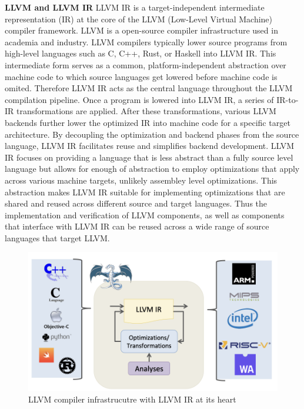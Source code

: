 \textbf{LLVM and LLVM IR}
LLVM IR is a target-independent intermediate representation (IR) at the core of the LLVM (Low-Level Virtual Machine) compiler framework. LLVM is a open-source compiler infrastructure used in academia and industry. LLVM compilers typically lower source programs from high-level languages such as C, C++, Rust, or Haskell into LLVM IR. This intermediate form serves as a common, platform-independent abstraction over machine code to which source languages get lowered before  machine code is omited. Therefore LLVM IR acts as the central language throughout the LLVM compilation pipeline. Once a program is lowered into LLVM IR, a series of IR-to-IR transformations are applied. After these transformations, various LLVM backends further lower the optimized IR into machine code for a specific target architecture. By decoupling the optimization and backend phases from the source language, LLVM IR facilitates reuse and simplifies backend development. LLVM IR focuses on providing a language that is less abstract than a fully source level language but allows for enough of abstraction to employ optimizations that apply across various machine targets, unlikely assembley level optimizations. This abstraction makes LLVM IR suitable for implementing optimizations that are shared and reused across different source and target languages. Thus the implementation and verification of LLVM components, as well as components that interface with LLVM IR can be reused across a wide range of source languages that target LLVM.
\begin{figure}[htbp]
  \centering
  \includegraphics[scale=0.37]{thesis/llvm.png}
 
  \caption{LLVM compiler infrastrucutre with LLVM IR at its heart}
  \label{fig:your-label}
\end{figure}

